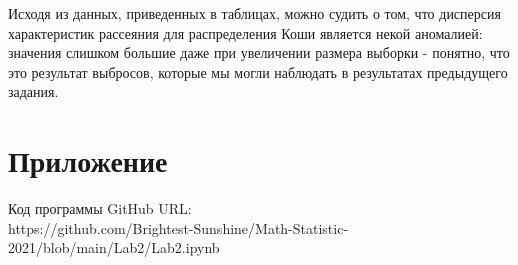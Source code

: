 \documentclass[a4paper]{article}
\begin{document}
\noindent Исходя из данных, приведенных в таблицах, можно судить о том, что дисперсия характеристик рассеяния для распределения Коши является некой аномалией: значения слишком большие даже при увеличении размера выборки - понятно, что это результат выбросов, которые мы могли наблюдать в результатах предыдущего задания.

\section {Приложение}
\noindent Код программы GitHub URL:\\
\newline https://github.com/Brightest-Sunshine/Math-Statistic-2021/blob/main/Lab2/Lab2.ipynb
\end{document}
